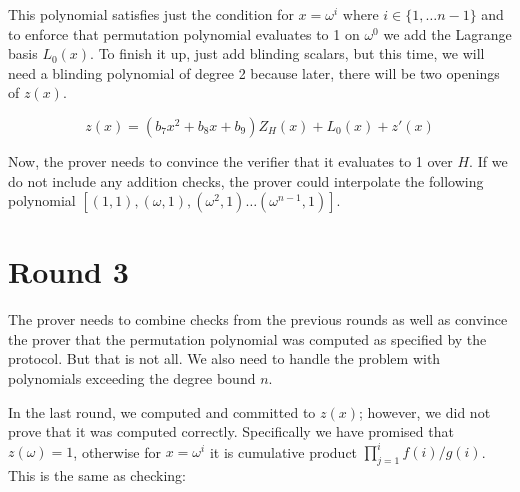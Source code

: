 This polynomial satisfies just the condition for $x = \omega^i \text{ where } i \in \{1, \ldots n-1\}$ and to enforce that permutation polynomial evaluates to 1 on $\omega^0$ we add the Lagrange basis $L_0(x)$. To finish it up, just add blinding scalars, but this time, we will need a blinding polynomial of degree 2 because later, there will be two openings of $z(x)$. 

\begin{equation*}
    z(x) = (b_7x^2 +b_8x +b_9)Z_H(x) + L_0(x) + z'(x)
\end{equation*}

Now, the prover needs to convince the verifier that it evaluates to 1 over $H$. If we do not include any addition checks, the prover could interpolate the following polynomial $[(1, 1),(\omega, 1),(\omega^2, 1) \ldots (\omega^{n-1}, 1)]$.



\section{Round 3}
\label{chap:round3}

The prover needs to combine checks from the previous rounds as well as convince the prover that the permutation polynomial was computed as specified by the protocol. But that is not all. We also need to handle the problem with polynomials exceeding the degree bound $n$. 



In the last round, we computed and committed to $z(x)$; however, we did not prove that it was computed correctly. Specifically we have promised that $z(\omega) = 1$, otherwise for $x = \omega^i$ it is cumulative product $\prod_{j=1}^i f(i) / g(i)$. This is the same as checking:

